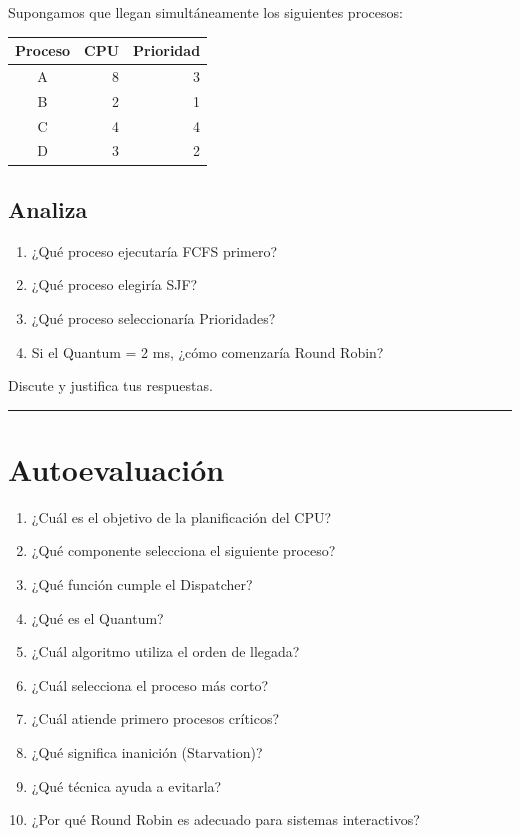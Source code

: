 \documentclass[
  spanish,
  letterpaper,
]{scrbook}
\newcounter{none} %
\providecommand{\tightlist}{%
  \setlength{\itemsep}{0pt}\setlength{\parskip}{0pt}}
\begin{document}
Supongamos que llegan simultáneamente los siguientes procesos:

{\def\LTcaptype{none} %
\begin{longtable}[]{@{}crr@{}}
\toprule\noalign{}
Proceso & CPU & Prioridad \\
\midrule\noalign{}
\endhead
\bottomrule\noalign{}
\endlastfoot
A & 8 & 3 \\
B & 2 & 1 \\
C & 4 & 4 \\
D & 3 & 2 \\
\end{longtable}
}

\section{Analiza}\label{analiza}

\begin{enumerate}
\def\labelenumi{\arabic{enumi}.}
\tightlist
\item
  ¿Qué proceso ejecutaría FCFS primero?
\item
  ¿Qué proceso elegiría SJF?
\item
  ¿Qué proceso seleccionaría Prioridades?
\item
  Si el Quantum = 2 ms, ¿cómo comenzaría Round Robin?
\end{enumerate}

Discute y justifica tus respuestas.

\begin{center}\rule{0.5\linewidth}{0.5pt}\end{center}


\chapter{Autoevaluación}\label{autoevaluaciuxf3n-3}

\begin{enumerate}
\def\labelenumi{\arabic{enumi}.}
\tightlist
\item
  ¿Cuál es el objetivo de la planificación del CPU?
\item
  ¿Qué componente selecciona el siguiente proceso?
\item
  ¿Qué función cumple el Dispatcher?
\item
  ¿Qué es el Quantum?
\item
  ¿Cuál algoritmo utiliza el orden de llegada?
\item
  ¿Cuál selecciona el proceso más corto?
\item
  ¿Cuál atiende primero procesos críticos?
\item
  ¿Qué significa inanición (Starvation)?
\item
  ¿Qué técnica ayuda a evitarla?
\item
  ¿Por qué Round Robin es adecuado para sistemas interactivos?
\end{enumerate}
\end{document}
